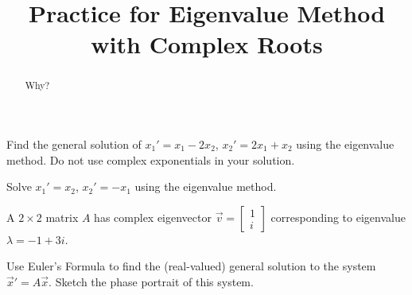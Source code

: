 \documentclass{ximera}
\title{Practice for Eigenvalue Method with Complex Roots}
\begin{document}
\begin{abstract}
Why?
\end{abstract}
\maketitle



\begin{exercise}
    Find the general solution of $x_1' = x_1 -2 x_2$, $x_2' = 2 x_1 + x_2$ using the eigenvalue method. Do not use complex exponentials in your solution.
\end{exercise}

\begin{exercise}%
    Solve $x_1' = x_2$, $x_2' = -x_1$ using the eigenvalue method.
\end{exercise}

\begin{exercise}
    A $2\times 2$ matrix $A$ has complex eigenvector $\displaystyle \vec{v}=\begin{bmatrix} 1\\ i \end{bmatrix}$ corresponding to eigenvalue $\lambda=-1+3i$. %
    \begin{tasks}
        \task Use Euler's Formula to find the (real-valued) general solution to the system $\vec{x}'=A\vec{x}$.
        \task Sketch the phase portrait of this system.
    \end{tasks}
\end{exercise}
\end{document}
